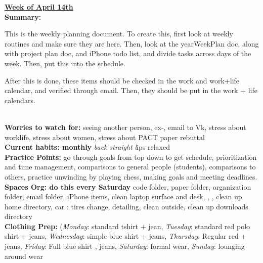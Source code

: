 

{\huge{\underline{\textbf{Week of April 14th}}}} \\
\textbf{Summary:} {\small This is the weekly planning document. To create
this, first look at weekly routines and make sure they are here. Then,
look at the yearWeekPlan doc, along with project plan doc, and iPhone
todo list, and divide tasks across days of the week. Then, put this
into the schedule.

After this is done, these items should be checked in the work and
work+life calendar, and verified through email.
Then, they should be put in the work + life
calendars.}\\

\textbf{Worries to watch for: }
{\small seeing another person,
ex-,
email to Vk,
stress about worklife, stress about women, stress about PACT paper rebuttal
}
\\
\textbf{Current habits: monthly}
{\small \textit{back straight}}
{\small \textit  lips relaxed }
\\
\textbf{Practice Points:} {\small go through goals from top down to get schedule, prioritization and time management,
comparisons to general people (students), comparisons to others, practice unwinding by playing chess, making goals and meeting deadlines}. \\

\textbf{Spaces Org: do this every Saturday } {\small code folder, paper folder, organization folder,  email folder, iPhone items, clean laptop surface and desk,
, , clean up home directory, car : tires change, detailing, clean outside, clean up downloads directory}\\


\textbf{Clothing Prep: }
{\small (\textit{Monday}: standard tshirt + jean, \textit{Tuesday}: standard red polo shirt + jeans, \textit{Wednesday}: simple blue shirt + jeans,
 \textit{Thursday}: Regular red + jeans, \textit{Friday}: Full blue shirt , jeans, \textit{Saturday}: formal wear,  \textit{Sunday}: lounging around wear
 }\\

